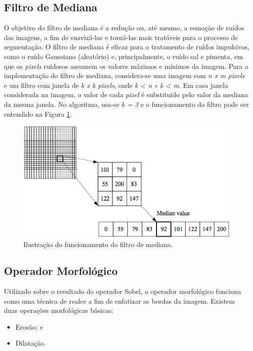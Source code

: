 \subsection*{Filtro de Mediana}
O objetivo do filtro de mediana é a redução ou, até mesmo, a remoção de ruídos das imagens, a fim de suavizá-las e torná-las mais tratáveis para o processo de segmentação. O filtro de mediana é eficaz para o tratamento de ruídos impulsivos, como o ruído Gaussiano (aleatório) e, principalmente, o ruído sal e pimenta, em que os \textit{pixels} ruidosos assumem os valores máximos e mínimos da imagem.
Para a implementação do filtro de mediana, considera-se uma imagem com \textit{n x m pixels} e um filtro com janela de \textit{k x k pixels}, onde \textit{k < n e k < m}. Em casa janela considerada na imagem, o valor de cada \textit{pixel} é substituído pelo valor da mediana da mesma janela. No algoritmo, usa-se \textit{k = 3} e o funcionamento do filtro pode ser entendido na Figura \ref{fig:filtromediana}.

	\begin{figure}[!htb]
       \begin{center}  
          \includegraphics[width=0.8\columnwidth]{img/filtromediana.jpg}
           \caption{\label{fig:filtromediana}Ilustração do funcionamento do filtro de mediana.\cite{ruparelia2012implementation}}
       \end{center}
   \end{figure}
   

\subsection*{Operador Morfológico}
Utilizado sobre o resultado do operador Sobel, o operador morfológico funciona como uma técnica de realce a fim de enfatizar as bordas da imagem. 
Existem duas operações morfológicas básicas:
\begin{itemize}
    \item Erosão; e
    \item Dilatação.
\end{itemize}    

